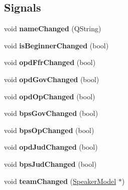 \subsection*{Signals}
\begin{DoxyCompactItemize}
\item 
\hypertarget{classSpeakerModel_abc1e08b179a5be5113c05bb667322d3e}{void {\bfseries name\-Changed} (Q\-String)}\label{classSpeakerModel_abc1e08b179a5be5113c05bb667322d3e}

\item 
\hypertarget{classSpeakerModel_a09c87320b245bf15ff4aa89c02a8e42e}{void {\bfseries is\-Beginner\-Changed} (bool)}\label{classSpeakerModel_a09c87320b245bf15ff4aa89c02a8e42e}

\item 
\hypertarget{classSpeakerModel_a8c98202e34443985f3c978e7c0e12b29}{void {\bfseries opd\-Ffr\-Changed} (bool)}\label{classSpeakerModel_a8c98202e34443985f3c978e7c0e12b29}

\item 
\hypertarget{classSpeakerModel_a3b92430002fe66dc2f27cb2c6a679bc3}{void {\bfseries opd\-Gov\-Changed} (bool)}\label{classSpeakerModel_a3b92430002fe66dc2f27cb2c6a679bc3}

\item 
\hypertarget{classSpeakerModel_aef00e10ddf1b31a6e2cba7ceed0c461c}{void {\bfseries opd\-Op\-Changed} (bool)}\label{classSpeakerModel_aef00e10ddf1b31a6e2cba7ceed0c461c}

\item 
\hypertarget{classSpeakerModel_addf70623030b6a3e7a1722864a4e5e94}{void {\bfseries bps\-Gov\-Changed} (bool)}\label{classSpeakerModel_addf70623030b6a3e7a1722864a4e5e94}

\item 
\hypertarget{classSpeakerModel_ab94f45899981923c871c6c3b25ade0e4}{void {\bfseries bps\-Op\-Changed} (bool)}\label{classSpeakerModel_ab94f45899981923c871c6c3b25ade0e4}

\item 
\hypertarget{classSpeakerModel_ac06b2a9fc7853e9ed8dd604a3d28900c}{void {\bfseries opd\-Jud\-Changed} (bool)}\label{classSpeakerModel_ac06b2a9fc7853e9ed8dd604a3d28900c}

\item 
\hypertarget{classSpeakerModel_a8a6976ca8f4daf01f66cbf88684c14b1}{void {\bfseries bps\-Jud\-Changed} (bool)}\label{classSpeakerModel_a8a6976ca8f4daf01f66cbf88684c14b1}

\item 
\hypertarget{classSpeakerModel_a2c22b4b9bf929b853ff5ccd95c051ffd}{void {\bfseries team\-Changed} (\hyperlink{classSpeakerModel}{Speaker\-Model} $\ast$)}\label{classSpeakerModel_a2c22b4b9bf929b853ff5ccd95c051ffd}

\end{DoxyCompactItemize}
